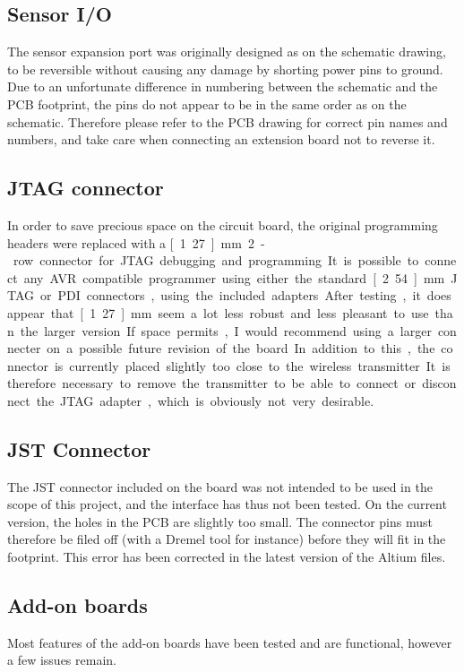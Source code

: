 \subsection{Sensor I/O}
The sensor expansion port was originally designed as on the schematic drawing,
to be reversible without causing any damage by shorting power pins to ground.
Due to an unfortunate difference in numbering between the schematic and the PCB
footprint, the pins do not appear to be in the same order as on the schematic.
Therefore please refer to the PCB drawing for correct pin names and numbers, and
take care when connecting an extension board not to reverse it.

\subsection{JTAG connector}
In order to save precious space on the circuit board, the original programming
headers were replaced with a \unit[1.27]{mm} 2-row connector for JTAG debugging
and programming. It is possible to connect any AVR compatible programmer using
either the standard \unit[2.54]{mm} JTAG or PDI connectors, using the included
adapters.

After testing, it does appear that \unit[1.27]{mm} seem a lot less robust and
less pleasant to use than the larger version. If space permits, I would
recommend using a larger connecter on a possible future revision of the board.

In addition to this, the connector is currently placed slightly too close to the
wireless transmitter. It is therefore necessary to remove the transmitter to be
able to connect or disconnect the JTAG adapter, which is obviously not very
desirable.

\subsection{JST Connector}
The JST connector included on the board was not intended to be used in the scope
of this project, and the interface has thus not been tested. On the current
version, the holes in the PCB are slightly too small. The connector pins must
therefore be filed off (with a Dremel tool for instance) before they will fit in
the footprint. This error has been corrected in the latest version of the Altium
files. %

\subsection{Add-on boards}
Most features of the add-on boards have been tested and are functional, however
a few issues remain.


